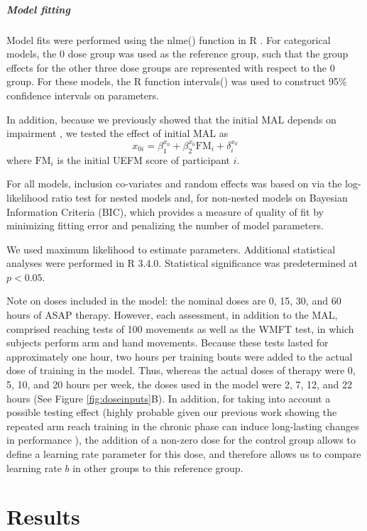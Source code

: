 \subparagraph{Model fitting}
Model fits were performed using the \textsf{nlme()} function in \textsf{R} \cite{Pinheiro2015}.
For categorical models, the 0 dose group was used as the reference group, such that the group effects for the other three dose groups are represented with respect to the 0 group. 
For these models, the \textsf{R} function \textsf{intervals()} was used to construct 95\% confidence intervals on parameters.

In addition, because we previously showed that the initial MAL depends on impairment \cite{Winstein2014}, we tested the effect of initial MAL as 
\begin{equation}
	x_{0i} = \beta_1^{x_0} + \beta_2^{x_0} \text{FM}_i + \delta_i^{x_0}
\end{equation}
where $ \text{FM}_i $ is the initial UEFM score of participant $ i $.

For all models, inclusion co-variates and random effects was based on via the log-likelihood ratio test for nested models and, for non-nested models on Bayesian Information Criteria (BIC), which provides a measure of quality of fit by minimizing fitting error and penalizing the number of model parameters. 

We used maximum likelihood to estimate parameters. 
Additional statistical analyses were performed in \textsf{R 3.4.0}. 
Statistical significance was predetermined at $ p < 0.05 $. 

Note on doses included in the model: the nominal doses are 0, 15, 30, and 60 hours of ASAP therapy. 
However, each assessment, in addition to the MAL, comprised reaching tests of 100 movements as well as the WMFT test, in which subjects perform arm and hand movements. 
Because these tests lasted for approximately one hour, two hours per training bouts were added to the actual dose of training in the model.
Thus, whereas the actual doses of therapy were 0, 5, 10, and 20 hours per week, the doses used in the model were 2, 7, 12, and 22 hours (See Figure \ref{fig:doseinputs}B). 
In addition, for taking into account a possible testing effect (highly probable given our previous work showing the repeated arm reach training in the chronic phase can induce long-lasting changes in performance \cite{Park2016}), the addition of a non-zero dose for the control group allows to define a learning rate parameter for this dose, and therefore allows us to compare learning rate $ b $ in other groups to this reference group.


\section{Results}


